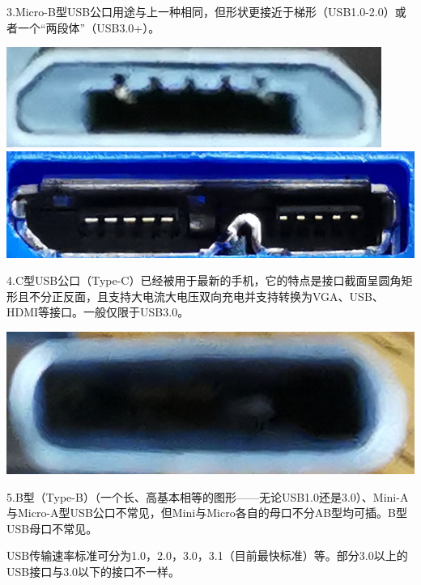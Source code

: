 3.Micro-B型USB公口用途与上一种相同，但形状更接近于梯形（USB1.0-2.0）或者一个“两段体”（USB3.0+）。
\begin{center}
\includegraphics[scale=0.4]{pic/Micro-USB-B-1}\\\includegraphics[scale=0.2]{pic/Micro-USB-B-2}
\end{center}\par
4.C型USB公口（Type-C）已经被用于最新的手机，它的特点是接口截面呈圆角矩形且不分正反面，且支持大电流大电压双向充电并支持转换为VGA、USB、HDMI等接口。一般仅限于USB3.0。
\begin{center}
	\includegraphics[scale=0.3]{pic/C-USB-1}
\end{center}\par
5.B型（Type-B）（一个长、高基本相等的图形——无论USB1.0还是3.0）、Mini-A与Micro-A型USB公口不常见，但Mini与Micro各自的母口不分AB型均可插。B型USB母口不常见。\par USB传输速率标准可分为1.0，2.0，3.0，3.1（目前最快标准）等。部分3.0以上的USB接口与3.0以下的接口不一样。
